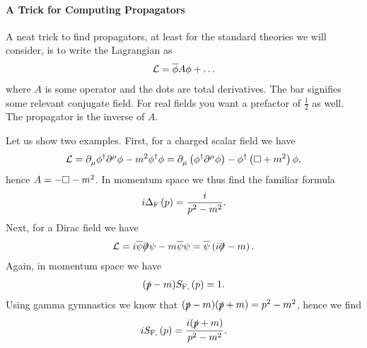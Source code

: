 \paragraph{A Trick for Computing Propagators}
A neat trick to find propagators, at least for the standard theories we will consider, is to write the Lagrangian as
\begin{align*}
	\mathcal{L} = \overline{\phi}A\phi + \dots
\end{align*}
where $A$ is some operator and the dots are total derivatives. The bar signifies some relevant conjugate field. For real fields you want a prefactor of $\frac{1}{2}$ as well. The propagator is the inverse of $A$.

Let us show two examples. First, for a charged scalar field we have
\begin{align*}
	\mathcal{L} = \partial^{}_{\mu}\phi^{\dagger}\partial^{\mu}_{}\phi - m^{2}\phi^{\dagger}\phi = \partial^{}_{\mu}\left(\phi^{\dagger}\partial^{\mu}_{}\phi\right) - \phi^{\dagger}\left(\square + m^{2}\right)\phi,
\end{align*}
hence $A = -\square - m^{2}$. In momentum space we thus find the familiar formula
\begin{align*}
	i\Delta_{\text{\text{F}}}\left(p\right) = \frac{i}{p^{2} - m^{2}}.
\end{align*}
Next, for a Dirac field we have
\begin{align*}
	\mathcal{L} = i\overline{\psi}\slashed{\partial^{}_{}}\psi - m\overline{\psi}\psi = \overline{\psi}\left(i\slashed{\partial^{}_{}} - m\right).
\end{align*}
Again, in momentum space we have
\begin{align*}
	(\slashed{p} - m)S_{\text{F}, }\left(p\right) = 1.
\end{align*}
Using gamma gymnastics we know that $(\slashed{p} - m)(\slashed{p} + m) = p^{2} - m^{2}$, hence we find
\begin{align*}
	iS_{\text{F}, }\left(p\right) = \frac{i(\slashed{p} + m)}{p^{2} - m^{2}}.
\end{align*}

